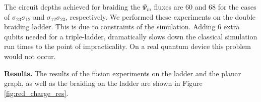 \documentclass[two column]{article}
\begin{document}

The circuit depths achieved for braiding the $\Psi_m$ fluxes are 60 and 68 for the cases of $\sigma_{23}\sigma_{12}$ and $\sigma_{12}\sigma_{23}$, respectively. We performed these experiments on the double braiding ladder. This is due to constraints of the simulation. Adding 6 extra qubits needed for a triple-ladder, dramatically slows down the classical simulation run times to the point of impracticality. On a real quantum device this problem would not occur.




\textbf{Results.}
The results of the fusion experiments on the ladder and the planar graph, as well as the braiding on the ladder are shown in Figure \ref{fig:red_charge_res}.
\end{document}
